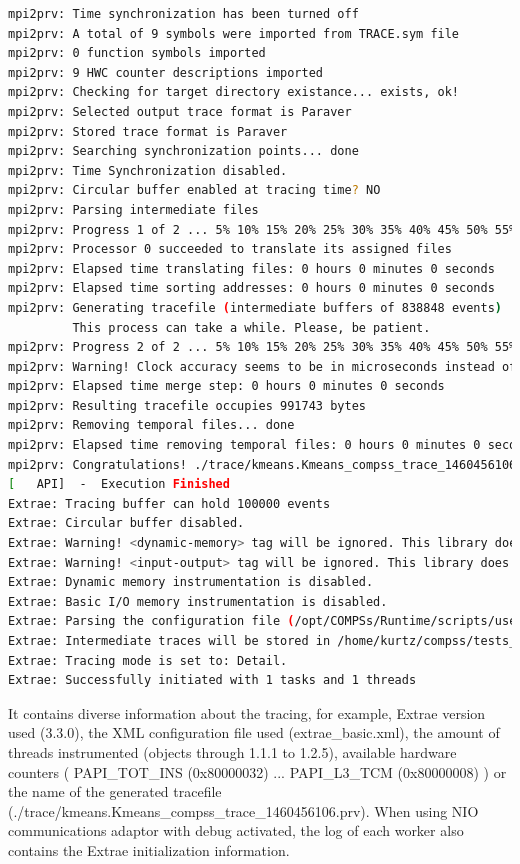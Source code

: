 \begin{lstlisting}[language=bash]
mpi2prv: Time synchronization has been turned off
mpi2prv: A total of 9 symbols were imported from TRACE.sym file
mpi2prv: 0 function symbols imported
mpi2prv: 9 HWC counter descriptions imported
mpi2prv: Checking for target directory existance... exists, ok!
mpi2prv: Selected output trace format is Paraver
mpi2prv: Stored trace format is Paraver
mpi2prv: Searching synchronization points... done
mpi2prv: Time Synchronization disabled.
mpi2prv: Circular buffer enabled at tracing time? NO
mpi2prv: Parsing intermediate files
mpi2prv: Progress 1 of 2 ... 5% 10% 15% 20% 25% 30% 35% 40% 45% 50% 55% 60% 65% 70% 75% 80% 85% 90% 95% done
mpi2prv: Processor 0 succeeded to translate its assigned files
mpi2prv: Elapsed time translating files: 0 hours 0 minutes 0 seconds
mpi2prv: Elapsed time sorting addresses: 0 hours 0 minutes 0 seconds
mpi2prv: Generating tracefile (intermediate buffers of 838848 events)
         This process can take a while. Please, be patient.
mpi2prv: Progress 2 of 2 ... 5% 10% 15% 20% 25% 30% 35% 40% 45% 50% 55% 60% 65% 70% 75% 80% 85% 90% 95% done
mpi2prv: Warning! Clock accuracy seems to be in microseconds instead of nanoseconds.
mpi2prv: Elapsed time merge step: 0 hours 0 minutes 0 seconds
mpi2prv: Resulting tracefile occupies 991743 bytes
mpi2prv: Removing temporal files... done
mpi2prv: Elapsed time removing temporal files: 0 hours 0 minutes 0 seconds
mpi2prv: Congratulations! ./trace/kmeans.Kmeans_compss_trace_1460456106.prv has been generated.
[   API]  -  Execution Finished
Extrae: Tracing buffer can hold 100000 events
Extrae: Circular buffer disabled.
Extrae: Warning! <dynamic-memory> tag will be ignored. This library does support instrumenting dynamic memory calls.
Extrae: Warning! <input-output> tag will be ignored. This library does support instrumenting I/O calls.
Extrae: Dynamic memory instrumentation is disabled.
Extrae: Basic I/O memory instrumentation is disabled.
Extrae: Parsing the configuration file (/opt/COMPSs/Runtime/scripts/user/../../configuration/xml/tracing/extrae_basic.xml) has ended
Extrae: Intermediate traces will be stored in /home/kurtz/compss/tests_local/app10
Extrae: Tracing mode is set to: Detail.
Extrae: Successfully initiated with 1 tasks and 1 threads
\end{lstlisting}

It contains diverse information about the tracing, for example, Extrae version used (3.3.0), the XML configuration file used (extrae\_basic.xml), the amount of 
threads instrumented (objects through 1.1.1 to 1.2.5), available hardware counters ( PAPI\_TOT\_INS (0x80000032) ... PAPI\_L3\_TCM (0x80000008) ) or the name 
of the generated tracefile (./trace/kmeans.Kmeans\_compss\_trace\_1460456106.prv). When using NIO communications adaptor with debug activated, the log of each worker
also contains the Extrae initialization information.

